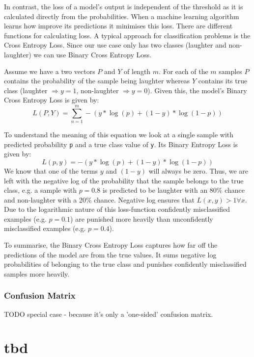 \documentclass[bsc,frontabs,parskip,deptreport]{infthesis}
\begin{document}
In contrast, the loss of a model's output is independent of the threshold as it is calculated directly from the probabilities.
When a machine learning algorithm learns how improve its predictions it minimises this loss. There are different functions for calculating loss.
A typical approach for classification problems is the Cross Entropy Loss. Since our use case only has two classes (laughter and non-laughter) we can use Binary Cross Entropy Loss. 

Assume we have a two vectors $P$ and $Y$ of length $m$. For each of the $m$ samples $P$ contains the probability of the sample being laughter whereas $Y$ contains its true class (laughter $\Rightarrow y=1$, non-laughter $ \Rightarrow y=0$).
Given this, the model's Binary Cross Entropy Loss is given by:
$$ L(P,Y) = \sum_{n=1}^{m}  -{(y*\log(p) + (1 - y)*\log(1 - p))}$$

To understand the meaning of this equation we look at a single sample with predicted probability \texttt{p} and a true class value of \texttt{y}. Its Binary Entropy Loss is given by: 
$$ L(p,y) = -{(y*\log(p) + (1 - y)*\log(1 - p))} $$
We know that one of the terms $y$ and $(1-y)$ will always be zero.
Thus, we are left with the negative log of the probability that the sample belongs to the true class, e.g. a sample with $p=0.8$ is predicted to be laughter with an 80\% chance and non-laughter with a 20\% chance. Negative log ensures that $L(x,y) > 1  \forall x $. 
Due to the logarithmic nature of this loss-function confidently misclassified examples (e.g. $p=0.1$) are punished more heavily than unconfidently misclassified examples (e.g. $p=0.4$).

To summarise, the Binary Cross Entropy Loss captures how far off the predictions of the model are from the true values. It sums negative log probabilities of belonging to the true class and punishes confidently misclassified samples more heavily.

\subsection{Confusion Matrix}
TODO
special case - because it's only a 'one-sided' confusion matrix.

\chapter{tbd} 
\end{document}
